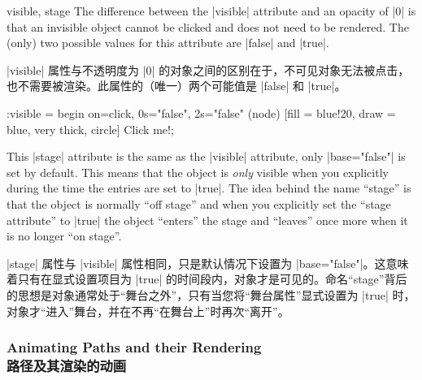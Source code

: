 \begin{tikzanimateattribute}{visible, stage}
    The difference between the |visible| attribute and an opacity of |0| is
    that an invisible object cannot be clicked and does not need to be
    rendered. The (only) two possible values for this attribute are |false| and
    |true|.
    
    |visible| 属性与不透明度为 |0| 的对象之间的区别在于，不可见对象无法被点击，也不需要被渲染。此属性的（唯一）两个可能值是 |false| 和 |true|。


\begin{codeexample}[
    preamble={\usetikzlibrary{animations}},
    animation list={1,2,3,4},
]
\tikz :visible = {begin on=click, 0s="false", 2s="false"}
  \node (node) [fill = blue!20, draw = blue, very thick, circle] {Click me!};
\end{codeexample}

    This |stage| attribute is the same as the |visible| attribute, only
    |base="false"| is set by default. This means that the object is \emph{only}
    visible when you explicitly during the time the entries are set to |true|.
    The idea behind the name ``stage'' is that the object is normally ``off
    stage'' and when you explicitly set the ``stage attribute'' to |true| the
    object ``enters'' the stage and ``leaves'' once more when it is no longer
    ``on stage''.
    
    |stage| 属性与 |visible| 属性相同，只是默认情况下设置为 |base="false"|。这意味着只有在显式设置项目为 |true| 的时间段内，对象才是可见的。命名“stage”背后的思想是对象通常处于“舞台之外”，只有当您将“舞台属性”显式设置为 |true| 时，对象才“进入”舞台，并在不再“在舞台上”时再次“离开”。


\begin{codeexample}[
    preamble={\usetikzlibrary{animations}},
    animation list={-1,0,1,2,3},
    animation bb={(1.3,-0.7) rectangle (2.7,0.7)},
]
\end{codeexample}
\end{tikzanimateattribute}


\subsubsection{Animating Paths and their Rendering\\路径及其渲染的动画}
\label{section-animation-paths}

